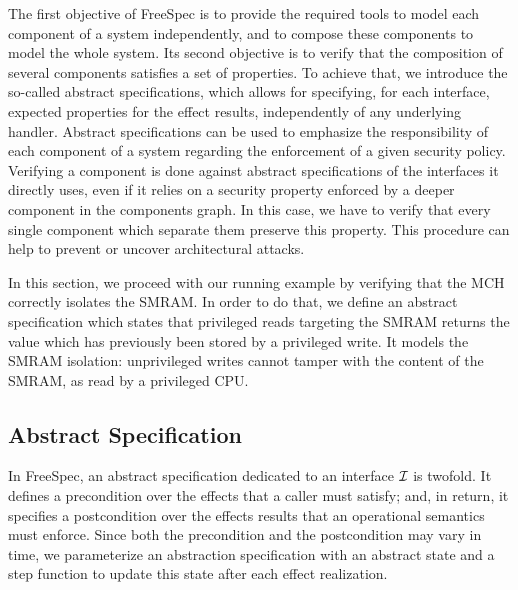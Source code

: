 The first objective of FreeSpec is to provide the required tools to model each
component of a system independently, and to compose these components to model
the whole system.
%
Its second objective is to verify that the composition of several components
satisfies a set of properties.
%
To achieve that, we introduce the so-called abstract specifications, which
allows for specifying, for each interface, expected properties for the effect
results, independently of any underlying handler.
%
Abstract specifications can be used to emphasize the responsibility of each
component of a system regarding the enforcement of a given security policy.
%
Verifying a component is done against abstract specifications of the interfaces
it directly uses, even if it relies on a security property enforced by a deeper
component in the components graph.
%
In this case, we have to verify that every single component which separate them
preserve this property.
%
This procedure can help to prevent or uncover architectural attacks.

In this section, we proceed with our running example by verifying that the MCH
correctly isolates the SMRAM.
%
In order to do that, we define an abstract specification which states that
privileged reads targeting the SMRAM returns the value which has previously been
stored by a privileged write. It models the SMRAM isolation: unprivileged writes
cannot tamper with the content of the SMRAM, as read by a privileged CPU.

\subsection{Abstract Specification}

In FreeSpec, an abstract specification dedicated to an interface $\mathcal{I}$ is
twofold.
%
It defines a precondition over the effects that a caller must satisfy; and, in
return, it specifies a postcondition over the effects results that an
operational semantics must enforce.
%
Since both the precondition and the postcondition may vary in time, we
parameterize an abstraction specification with an abstract state and a step
function to update this state after each effect realization.

